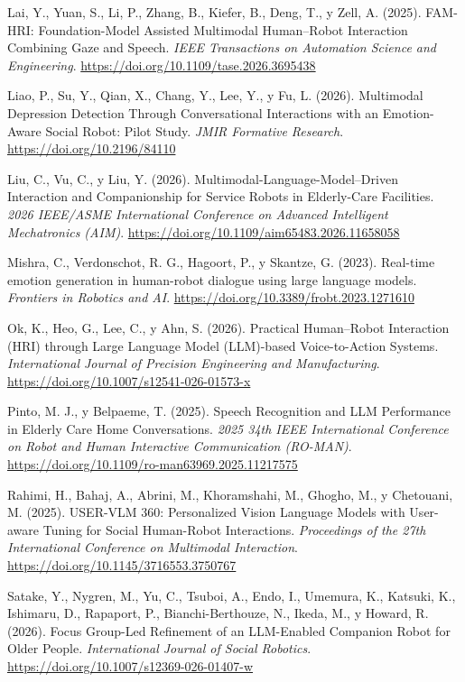  Lai, Y., Yuan, S., Li, P., Zhang, B., Kiefer, B., Deng, T., y Zell, A. (2025). FAM-HRI: Foundation-Model Assisted Multimodal Human--Robot Interaction Combining Gaze and Speech. \textit{IEEE Transactions on Automation Science and Engineering}. \url{https://doi.org/10.1109/tase.2026.3695438}

 Liao, P., Su, Y., Qian, X., Chang, Y., Lee, Y., y Fu, L. (2026). Multimodal Depression Detection Through Conversational Interactions with an Emotion-Aware Social Robot: Pilot Study. \textit{JMIR Formative Research}. \url{https://doi.org/10.2196/84110}

 Liu, C., Vu, C., y Liu, Y. (2026). Multimodal-Language-Model--Driven Interaction and Companionship for Service Robots in Elderly-Care Facilities. \textit{2026 IEEE/\allowbreak{}ASME International Conference on Advanced Intelligent Mechatronics (AIM)}. \url{https://doi.org/10.1109/aim65483.2026.11658058}

 Mishra, C., Verdonschot, R. G., Hagoort, P., y Skantze, G. (2023). Real-time emotion generation in human-robot dialogue using large language models. \textit{Frontiers in Robotics and AI}. \url{https://doi.org/10.3389/frobt.2023.1271610}

 Ok, K., Heo, G., Lee, C., y Ahn, S. (2026). Practical Human--Robot Interaction (HRI) through Large Language Model (LLM)-based Voice-to-Action Systems. \textit{International Journal of Precision Engineering and Manufacturing}. \url{https://doi.org/10.1007/s12541-026-01573-x}

 Pinto, M. J., y Belpaeme, T. (2025). Speech Recognition and LLM Performance in Elderly Care Home Conversations. \textit{2025 34th IEEE International Conference on Robot and Human Interactive Communication (RO-MAN)}. \url{https://doi.org/10.1109/ro-man63969.2025.11217575}

 Rahimi, H., Bahaj, A., Abrini, M., Khoramshahi, M., Ghogho, M., y Chetouani, M. (2025). USER-VLM 360: Personalized Vision Language Models with User-aware Tuning for Social Human-Robot Interactions. \textit{Proceedings of the 27th International Conference on Multimodal Interaction}. \url{https://doi.org/10.1145/3716553.3750767}

 Satake, Y., Nygren, M., Yu, C., Tsuboi, A., Endo, I., Umemura, K., Katsuki, K., Ishimaru, D., Rapaport, P., Bianchi-Berthouze, N., Ikeda, M., y Howard, R. (2026). Focus Group-Led Refinement of an LLM-Enabled Companion Robot for Older People. \textit{International Journal of Social Robotics}. \url{https://doi.org/10.1007/s12369-026-01407-w}

